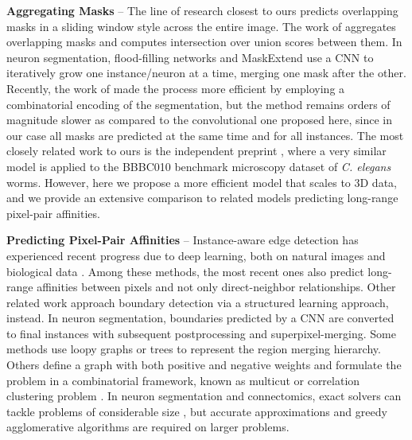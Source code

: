 \textbf{Aggregating \maskname Masks} -- 
The line of research closest to ours predicts overlapping \maskname masks in a sliding window style across the entire image. The work of \cite{liu2016multi} aggregates overlapping masks and computes intersection over union scores between them.
In neuron segmentation, flood-filling networks \cite{januszewski2018high} and MaskExtend \cite{meirovitch2016multi} use a CNN to iteratively grow one instance/neuron at a time, merging one mask after the other. Recently, the work of \cite{meirovitch2019cross} made the process more efficient by employing a combinatorial encoding of the segmentation, but the method remains orders of magnitude slower as compared to the convolutional one proposed here, since in our case all masks are predicted at the same time and for all instances.
The most closely related work to ours is the independent preprint \cite{hirsch2020patchperpix}, where a very similar model is applied to the BBBC010 benchmark microscopy dataset of \emph{C. elegans} worms. However, here we propose a more efficient model that scales to 3D data, and we provide an extensive comparison to related models predicting long-range pixel-pair affinities. 

\textbf{Predicting Pixel-Pair Affinities} --  
Instance-aware edge detection has experienced recent progress due to deep learning, both on natural images \cite{Gao_2019_ICCV,liu2018affinity,kirillov2017instancecut,xie2015holistically,kokkinos2015pushing} and biological data \cite{lee2017superhuman,wolf2018mutex,schmidt2018cell,zeng2017deepem3d,parag2017anisotropic,bailoni2019generalized,meirovitch2016multi,ciresan2012deep}. Among these methods, the most recent ones also predict long-range affinities between pixels and not only direct-neighbor relationships.
Other related work \cite{funke2018large,turaga2009maximin} approach boundary detection via a structured learning approach, instead.
In neuron segmentation, boundaries predicted by a CNN are converted to final instances with subsequent postprocessing and superpixel-merging.
Some methods use loopy graphs \cite{kaynig2015large,krasowski2015improving} or trees \cite{meirovitch2016multi,liu2016sshmt,liu2014modular,funke2015learning,uzunbas2016efficient,nunez2013machine,knowles2016rhoananet} to represent the region merging hierarchy. 
Others define a graph with both positive and negative weights and formulate the problem in a combinatorial framework, known as multicut or correlation clustering problem \cite{kappes2011globally,chopra1991multiway,beier2017multicut}. 
In neuron segmentation and connectomics, exact solvers can tackle problems of considerable size \cite{andres2012globally}, but accurate approximations \cite{pape2017solving,beier2017multicut,beier2016efficient,yarkony2012fast,beier2014cut} and greedy agglomerative algorithms \cite{levinkov2017comparative,wolf2019mutex,bailoni2019generalized} are required on larger problems.


